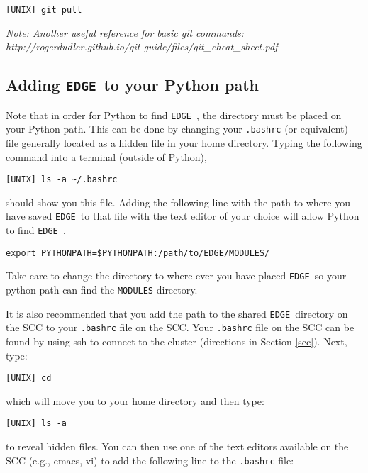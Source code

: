 \documentclass{article}
\newcommand{\edge}{\texttt{EDGE }}
\begin{document}
\texttt{[UNIX] git pull}
\vspace{2mm}

\noindent \textit{Note: Another useful reference for basic git commands: http://rogerdudler.github.io/git-guide/files/git\_cheat\_sheet.pdf}

\subsection{Adding \edge to your Python path} \label{addingedgetopath}

\noindent Note that in order for Python to find \edge, the directory must be placed on your Python path. This can be done by changing your \texttt{.bashrc} (or equivalent) file generally located as a hidden file in your home directory. Typing the following command into a terminal (outside of Python),

\vspace{2mm}
\texttt{[UNIX] ls -a \textasciitilde/.bashrc}
\vspace{2mm}

\noindent should show you this file. Adding the following line with the path to where you have saved \edge to that file with the text editor of your choice will allow Python to find \edge.

\vspace{2mm}
\texttt{export PYTHONPATH=\${PYTHONPATH}:/path/to/EDGE/MODULES/}
\vspace{2mm}

\noindent Take care to change the directory to where ever you have placed \edge so your python path can find the \texttt{MODULES} directory.

\vspace{2mm}

\noindent It is also recommended that you add the path to the shared \edge directory on the SCC to your \texttt{.bashrc} file on the SCC. Your \texttt{.bashrc} file on the SCC can be found by using ssh to connect to the cluster (directions in Section \ref{scc}). Next, type: 

\vspace{2mm}
\texttt{[UNIX] cd} 
\vspace{2mm}

\noindent which will move you to your home directory and then type:

\vspace{2mm}
\texttt{[UNIX] ls -a} 
\vspace{2mm}

\noindent to reveal hidden files. You can then use one of the text editors available on the SCC (e.g., emacs, vi) to add the following line to the \texttt{.bashrc} file:
\end{document}
